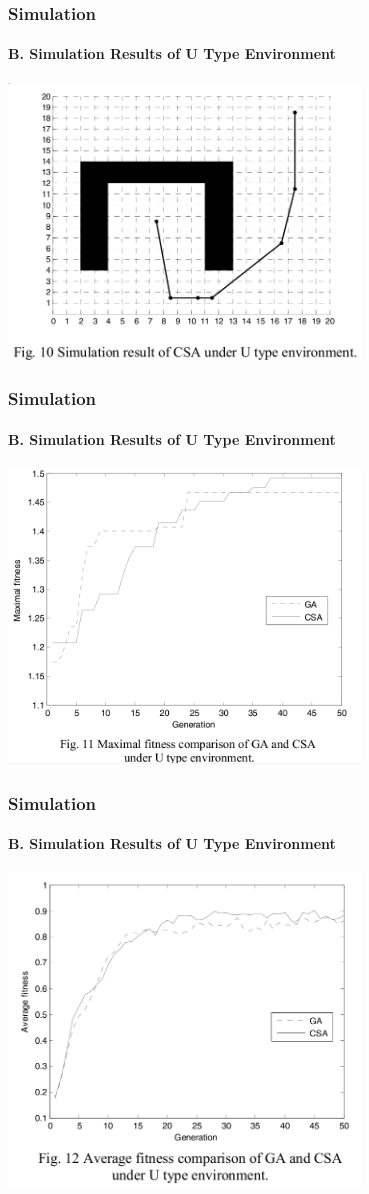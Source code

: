 \frame
{
\frametitle{Simulation}
\framesubtitle{B. Simulation Results of U Type Environment}
\begin{center}
	\includegraphics[width=0.7\textwidth]{img/csaresult2}
\end{center}
}
\frame
{
\frametitle{Simulation}
\framesubtitle{B. Simulation Results of U Type Environment}
\begin{center}
	\includegraphics[width=0.7\textwidth]{img/maximal2}
\end{center}
}
\frame
{
\frametitle{Simulation}
\framesubtitle{B. Simulation Results of U Type Environment}
\begin{center}
	\includegraphics[width=0.7\textwidth]{img/average2}
\end{center}
}
